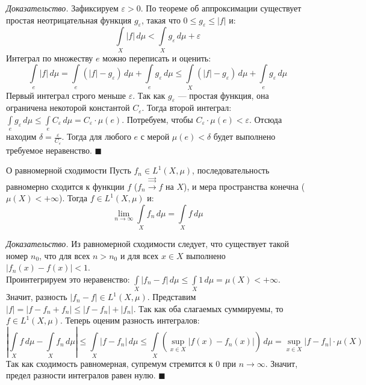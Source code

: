 \documentclass[12pt,a4paper]{article}
\newenvironment{Proof}[1][Доказательство]{\vspace{0.5em}\noindent\textit{#1.}\hspace{0.5em}\ignorespaces}{\hfill$\blacksquare$\vspace{1em}}
\begin{document}
\begin{Proof}
Зафиксируем $\varepsilon > 0$. По теореме об аппроксимации существует простая неотрицательная функция $g_\varepsilon$, такая что $0 \le g_\varepsilon \le |f|$ и:
$$ \int\limits_X |f| \, d\mu < \int\limits_X g_\varepsilon \, d\mu + \varepsilon $$
Интеграл по множеству $e$ можно переписать и оценить:
$$ \int\limits_e |f| \, d\mu = \int\limits_e (|f| - g_\varepsilon) \, d\mu + \int\limits_e g_\varepsilon \, d\mu \le \int\limits_X (|f| - g_\varepsilon) \, d\mu + \int\limits_e g_\varepsilon \, d\mu $$
Первый интеграл строго меньше $\varepsilon$. 
Так как $g_\varepsilon$ — простая функция, она ограничена некоторой константой $C_\varepsilon$. Тогда второй интеграл: $\int\limits_e g_\varepsilon \, d\mu \le \int\limits_e C_\varepsilon \, d\mu = C_\varepsilon \cdot \mu(e)$.
Потребуем, чтобы $C_\varepsilon \cdot \mu(e) < \varepsilon$. Отсюда находим $\delta = \frac{\varepsilon}{C_\varepsilon}$.
Тогда для любого $e$ с мерой $\mu(e) < \delta$ будет выполнено требуемое неравенство.
\end{Proof}

\begin{Theorem}{О равномерной сходимости}{}
Пусть $f_n \in L^1(X, \mu)$, последовательность равномерно сходится к функции $f$ ($f_n \xrightarrow{\rightrightarrows} f$ на $X$), и мера пространства конечна ($\mu(X) < +\infty$). Тогда $f \in L^1(X, \mu)$ и:
$$ \lim\limits_{n \to \infty} \int\limits_X f_n \, d\mu = \int\limits_X f \, d\mu $$
\end{Theorem}

\begin{Proof}
Из равномерной сходимости следует, что существует такой номер $n_0$, что для всех $n > n_0$ и для всех $x \in X$ выполнено $|f_n(x) - f(x)| < 1$. \\
Проинтегрируем это неравенство: $\int\limits_X |f_n - f| \, d\mu \le \int\limits_X 1 \, d\mu = \mu(X) < +\infty$.
Значит, разность $|f_n - f| \in L^1(X, \mu)$. 
Представим $|f| = |f - f_n + f_n| \le |f - f_n| + |f_n|$. Так как оба слагаемых суммируемы, то $f \in L^1(X, \mu)$.
Теперь оценим разность интегралов:
$$ \left| \int\limits_X f \, d\mu - \int\limits_X f_n \, d\mu \right| \le \int\limits_X |f - f_n| \, d\mu \le \int\limits_X \left( \sup\limits_{x \in X} |f(x) - f_n(x)| \right) \, d\mu = \sup\limits_{x \in X} |f - f_n| \cdot \mu(X) $$
Так как сходимость равномерная, супремум стремится к $0$ при $n \to \infty$. Значит, предел разности интегралов равен нулю.
\end{Proof}
\end{document}
